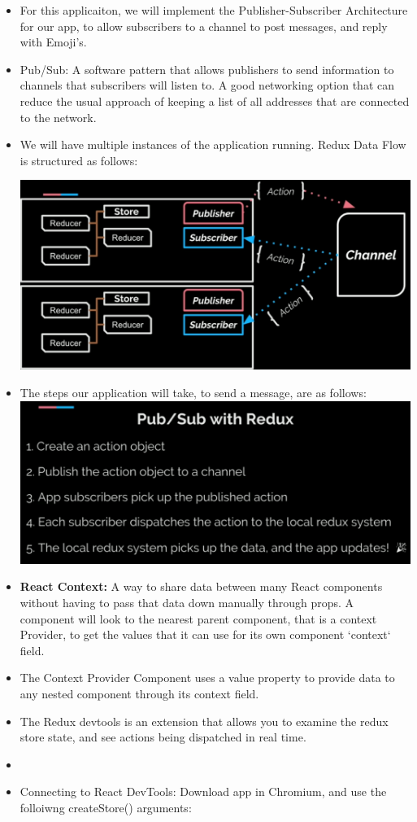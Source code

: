 \documentclass[8pt,a4paper]{extarticle}
\begin{document}
\begin{itemize}
\item For this applicaiton, we will implement the Publisher-Subscriber Architecture for our app, to allow subscribers to a channel to post messages, and reply with Emoji's.
\item Pub/Sub: A software pattern that allows publishers to send information to channels that subscribers will listen to. A good networking option that can reduce the usual approach of keeping a list of all addresses that are connected to the network.
\item We will have multiple instances of the application running. Redux Data Flow is structured as follows:

\includegraphics[scale=0.20]{pubsub.png}

\item The steps our application will take, to send a message, are as follows:
\includegraphics[scale=0.20]{pubsublist.png}

\item \textbf{React Context:} A way to share data between many React components without having to pass that data down manually through props. A component will look to the nearest parent component, that is a context Provider, to get the values that it can use for its own component `context` field.
\item The Context Provider Component uses a value property to provide data to any nested component through its context field.
\item The Redux devtools is an extension that allows you to examine the redux store state, and see actions being dispatched in real time.
\item
\item Connecting to React DevTools: Download app in Chromium, and use the folloiwng createStore() arguments:


\end{itemize}
\end{document}
